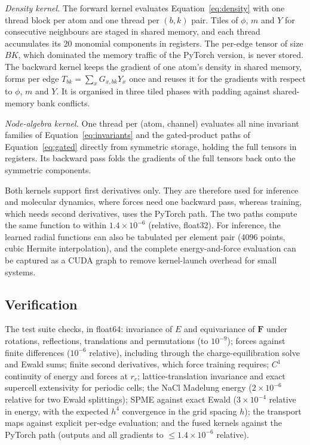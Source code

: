 \documentclass[journal=jctcce,manuscript=article,layout=traditional]{achemso}
\newcommand{\vect}[1]{\bm{#1}}
\begin{document}
\emph{Density kernel.} The forward kernel evaluates Equation~\ref{eq:density} with one thread block per atom and one
thread per $(b,k)$ pair. Tiles of $\phi$, $m$ and $Y$ for consecutive neighbours are staged in shared memory, and
each thread accumulates its 20 monomial components in registers. The per-edge tensor of size $BK$, which dominated
the memory traffic of the PyTorch version, is never stored. The backward kernel keeps the gradient of one atom's
density in shared memory, forms per edge $T_{bk}=\sum_xG_{x,bk}Y_x$ once and reuses it for the gradients with
respect to $\phi$, $m$ and $Y$. It is organised in three tiled phases with padding against shared-memory bank
conflicts.

\emph{Node-algebra kernel.} One thread per (atom, channel) evaluates all nine invariant families of
Equation~\ref{eq:invariants} and the gated-product paths of Equation~\ref{eq:gated} directly from symmetric storage, holding the
full tensors in registers. Its backward pass folds the gradients of the full tensors back onto the symmetric
components.

Both kernels support first derivatives only. They are therefore used for inference and molecular dynamics, where
forces need one backward pass, whereas training, which needs second derivatives, uses the PyTorch path. The two
paths compute the same function to within $1.4\times10^{-6}$ (relative, float32). For inference, the learned radial
functions can also be tabulated per element pair (4096 points, cubic Hermite interpolation), and the complete
energy-and-force evaluation can be captured as a CUDA graph to remove kernel-launch overhead for small systems.

\subsection{Verification}
\label{sec:verification}
The test suite checks, in float64: invariance of $E$ and equivariance of $\vect F$ under rotations, reflections,
translations and permutations (to $10^{-9}$); forces against finite differences ($10^{-6}$ relative), including
through the charge-equilibration solve and Ewald sums; finite second derivatives, which force training requires;
$C^1$ continuity of energy and forces at $r_c$; lattice-translation invariance and exact supercell extensivity for
periodic cells; the NaCl Madelung energy ($2\times10^{-6}$ relative for two Ewald splittings); SPME against exact
Ewald ($3\times10^{-4}$ relative in energy, with the expected $h^4$ convergence in the grid spacing $h$); the transport
maps against explicit per-edge evaluation; and the fused kernels against the PyTorch path (outputs and all gradients
to $\le1.4\times10^{-6}$ relative).
\end{document}
